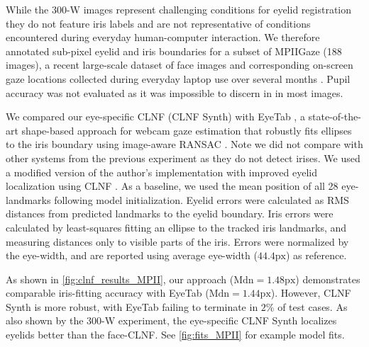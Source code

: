 While the 300-W images represent challenging conditions for eyelid registration they do not feature iris labels and are not representative of conditions encountered during everyday human-computer interaction.
We therefore annotated sub-pixel eyelid and iris boundaries for a subset of MPIIGaze \cite{zhang15_cvpr} (188 images), a recent large-scale dataset of face images and corresponding on-screen gaze locations collected during everyday laptop use over several months \cite{zhang15_cvpr}.
Pupil accuracy was not evaluated as it was impossible to discern in in most images.

We compared our eye-specific CLNF (CLNF Synth) with EyeTab \cite{wood2014eyetab}, a state-of-the-art shape-based approach for webcam gaze estimation that robustly fits ellipses to the iris boundary using image-aware RANSAC \cite{swirski2012robust}. Note we did not compare with other systems from the previous experiment as they do not detect irises.
We used a modified version of the author's implementation with improved eyelid localization using CLNF \cite{baltrusaitis2013constrained}.
As a baseline, we used the mean position of all 28 eye-landmarks following model initialization.
Eyelid errors were calculated as RMS distances from predicted landmarks to the eyelid boundary.
Iris errors were calculated by least-squares fitting an ellipse to the tracked iris landmarks, and measuring distances only to visible parts of the iris.
Errors were normalized by the eye-width, and are reported using average eye-width ($44.4\textrm{px}$) as reference.

As shown in \autoref{fig:clnf_results_MPII}, our approach ($\textrm{Mdn}\!=\!1.48\textrm{px}$) demonstrates comparable iris-fitting accuracy with EyeTab ($\textrm{Mdn}\!=\!1.44\textrm{px}$).
However, CLNF Synth is more robust, with EyeTab failing to terminate in $2\%$ of test cases.
As also shown by the 300-W experiment, the eye-specific CLNF Synth localizes eyelids better than the face-CLNF.
See \autoref{fig:fits_MPII} for example model fits.

